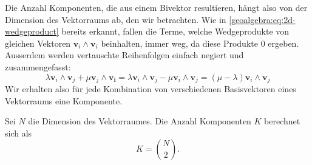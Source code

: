 Die Anzahl Komponenten, die aus einem Bivektor resultieren, hängt also von der Dimension des Vektorraums ab, den wir betrachten.
Wie in \eqref{geoalgebra:eq:2d-wedgeproduct} bereits erkannt, fallen die Terme, welche Wedgeprodukte von gleichen Vektoren $\mathbf{v}_i \wedge \mathbf{v}_i$ beinhalten,
immer weg, da diese Produkte $0$ ergeben. Ausserdem werden vertauschte Reihenfolgen einfach negiert und zusammengefasst: 
\begin{equation}
  \lambda \mathbf{v}_i \wedge \mathbf{v}_j + \mu \mathbf{v}_j \wedge \mathbf{v_i} = \lambda \mathbf{v}_i \wedge \mathbf{v}_j - \mu \mathbf{v}_i \wedge \mathbf{v}_j = (\mu - \lambda) \mathbf{v}_i \wedge \mathbf{v}_j
\end{equation}
Wir erhalten also für jede Kombination von verschiedenen Basisvektoren eines Vektorraums eine Komponente.
\begin{satz}
Sei $N$ die Dimension des Vektorraumes. Die Anzahl Komponenten $K$ berechnet sich als
  \begin{equation}
    K = \binom{N}{2}.
  \end{equation}
\end{satz}



